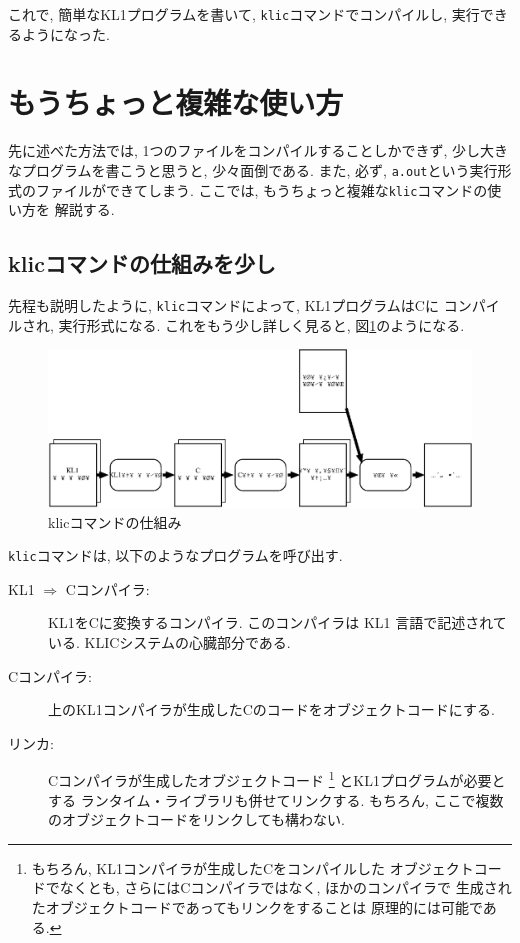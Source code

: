 \documentclass[a4,titlepage]{jsreport}
\begin{document}
これで, 簡単なKL1プログラムを書いて, \verb|klic|コマンドでコンパイルし, 
実行できるようになった.  

\section{もうちょっと複雑な使い方}
先に述べた方法では, 1つのファイルをコンパイルすることしかできず, 
少し大きなプログラムを書こうと思うと, 少々面倒である.  
また, 必ず, \verb|a.out|という実行形式のファイルができてしまう.  
ここでは, もうちょっと複雑な\verb|klic|コマンドの使い方を
解説する.  

\subsection{klicコマンドの仕組みを少し}
先程も説明したように, \verb|klic|コマンドによって, KL1プログラムはCに
コンパイルされ, 実行形式になる.  これをもう少し詳しく見ると, 
図\ref{fig:klicflow}のようになる.  

\begin{figure}
\begin{center}
\includegraphics[width=.8\textwidth]{fig/klicflow.eps}
\end{center}
\caption{klicコマンドの仕組み}
\label{fig:klicflow}
\end{figure}

\verb|klic|コマンドは, 以下のようなプログラムを呼び出す.  

\begin{description}
\item[KL1 $\Rightarrow$ Cコンパイラ:\ ]
KL1をCに変換するコンパイラ.  
このコンパイラは KL1 言語で記述されている.  KLICシステムの心臓部分である.  

\item[Cコンパイラ:\ ]
上のKL1コンパイラが生成したCのコードをオブジェクトコードにする.  

\item[リンカ:\ ]
Cコンパイラが生成したオブジェクトコード
\footnote{もちろん, KL1コンパイラが生成したCをコンパイルした
オブジェクトコードでなくとも, 
さらにはCコンパイラではなく, ほかのコンパイラで
生成されたオブジェクトコードであってもリンクをすることは
原理的には可能である.  }
とKL1プログラムが必要とする
ランタイム・ライブラリも併せてリンクする.  
もちろん, ここで複数のオブジェクトコードをリンクしても構わない.  
\end{description}
\end{document}
